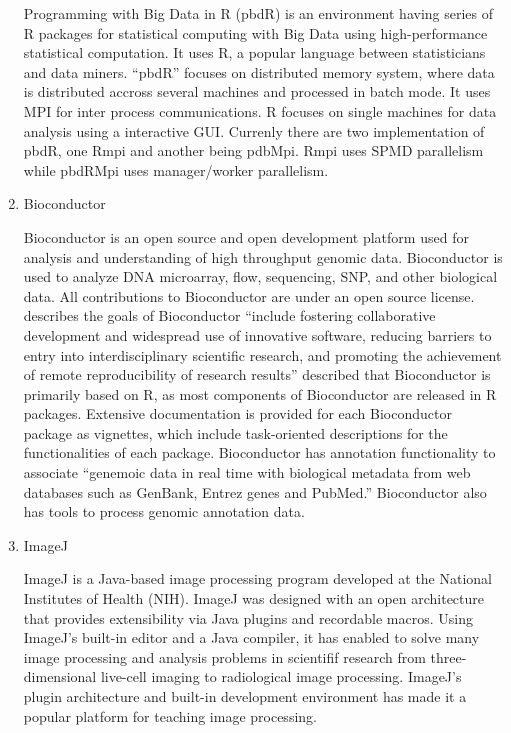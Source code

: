 \begin{enumerate}
Programming with Big Data in R (pbdR) \label{\detokenize{i524/technologies:id73}}{\hyperref[\detokenize{i524/technologies:www-pbdr}]{\sphinxcrossref{{[}64{]}}}} is an
environment having series of R packages for statistical computing
with Big Data using high-performance statistical computation. It
uses R, a popular language between statisticians and data
miners. ``pbdR'' focuses on distributed memory system, where data is
distributed accross several machines and processed in batch
mode. It uses MPI for inter process communications. R focuses on
single machines for data analysis using a interactive
GUI. Currenly there are two implementation of pbdR, one Rmpi and
another being pdbMpi.  Rmpi uses SPMD parallelism while pbdRMpi
uses manager/worker parallelism.

\item {} 
Bioconductor

Bioconductor is an open source and open development platform used
for analysis and understanding of high throughput genomic
data. Bioconductor is used to analyze DNA microarray, flow,
sequencing, SNP, and other biological data. All contributions to
Bioconductor are under an open source
license. \label{\detokenize{i524/technologies:id74}}{\hyperref[\detokenize{i524/technologies:bioconductor-article-2004}]{\sphinxcrossref{{[}65{]}}}} describes the goals of
Bioconductor ``include fostering collaborative development and
widespread use of innovative software, reducing barriers to entry
into interdisciplinary scientific research, and promoting the
achievement of remote reproducibility of research results''
\label{\detokenize{i524/technologies:id75}}{\hyperref[\detokenize{i524/technologies:www-bioconductor-about}]{\sphinxcrossref{{[}66{]}}}} described that Bioconductor is
primarily based on R, as most components of Bioconductor are
released in R packages. Extensive documentation is provided for
each Bioconductor package as vignettes, which include
task-oriented descriptions for the functionalities of each
package. Bioconductor has annotation functionality to associate
``genemoic data in real time with biological metadata from web
databases such as GenBank, Entrez genes and PubMed.''  Bioconductor
also has tools to process genomic annotation data.

\item {} 
ImageJ

ImageJ is a Java-based image processing program developed at the
National Institutes of Health (NIH). ImageJ was designed with an
open architecture that provides extensibility via Java plugins and
recordable macros.  Using ImageJ's built-in editor and a Java
compiler, it has enabled to solve many image processing and
analysis problems in scientifif research from three-dimensional
live-cell imaging to radiological image processing.  ImageJ's
plugin architecture and built-in development environment has made
it a popular platform for teaching image
processing. \label{\detokenize{i524/technologies:id76}}{\hyperref[\detokenize{i524/technologies:www-imagej}]{\sphinxcrossref{{[}67{]}}}}


\end{enumerate}
